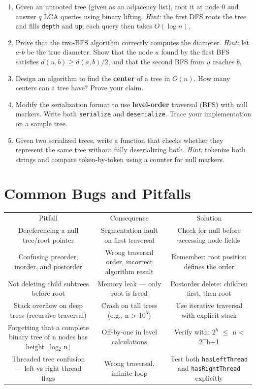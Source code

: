 \begin{enumerate}
\item Given an unrooted tree (given as an adjacency list), root it at
      node 0 and answer $q$ LCA queries using binary lifting.
      \textit{Hint:} the first DFS roots the tree and fills \texttt{depth}
      and \texttt{up}; each query then takes $O(\log n)$.

\item Prove that the two-BFS algorithm correctly computes the diameter.
      \textit{Hint:} let $a$-$b$ be the true diameter.  Show that the
      node $u$ found by the first BFS satisfies $d(u,b) \geq d(a,b)/2$,
      and that the second BFS from $u$ reaches $b$.

\item Design an algorithm to find the \textbf{center} of a tree in
      $O(n)$.  How many centers can a tree have?  Prove your claim.

\item Modify the serialization format to use \textbf{level-order}
      traversal (BFS) with null markers.  Write both
      \texttt{serialize} and \texttt{deserialize}.  Trace your
      implementation on a sample tree.

\item Given two serialized trees, write a function that checks whether
      they represent the same tree without fully deserializing both.
      \textit{Hint:} tokenize both strings and compare token-by-token
      using a counter for null markers.
\end{enumerate}

\section{Common Bugs and Pitfalls}

\begin{center}
\begin{tabular}{ccc}
\toprule
Pitfall & Consequence & Solution \\
Dereferencing a null tree/root pointer & Segmentation fault on first traversal & Check for null before accessing node fields \\
Confusing preorder, inorder, and postorder & Wrong traversal order, incorrect algorithm result & Remember: root position defines the order \\
Not deleting child subtrees before root & Memory leak — only root is freed & Postorder delete: children first, then root \\
Stack overflow on deep trees (recursive traversal) & Crash on tall trees (e.g., n > 1$0^{5}$) & Use iterative traversal with explicit stack \\
Forgetting that a complete binary tree of n nodes has height $\lfloor $log$_{2}$ n$\rfloor $ & Off-by-one in level calculations & Verify with: $2^{h}$ $\le $ n < 2\textasciicircum{}{h+1} \\
Threaded tree confusion — left vs right thread flags & Wrong traversal, infinite loop & Test both \texttt{hasLeftThread} and \texttt{hasRightThread} explicitly \\

\bottomrule
\end{tabular}
\end{center}
